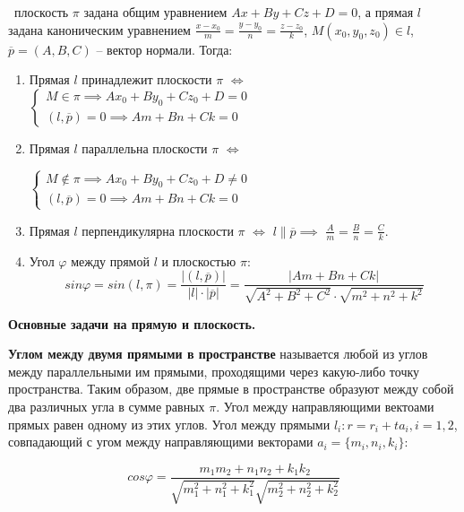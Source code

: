 \mathLet \ плоскость $\pi$ задана общим уравнением $Ax + By + Cz + D = 0$, а прямая $l$ задана каноническим уравнением $\frac{x-x_0}{m} = \frac{y-y_0}{n} = \frac{z-z_0}{k}$, $M(x_0, y_0, z_0) \in l$, $\overline{p} = (A, B, C)$ -- вектор нормали. Тогда:
\begin{enumerate}
    \item Прямая $l$ принадлежит плоскости $\pi$ $\iff$ \newline
    $
    \begin{cases}
        M \in \pi \implies Ax_0 +By_0 +Cz_0 +D = 0 \\
        (l, \overline{p}) = 0  \implies Am+Bn+Ck = 0
    \end{cases}
    $
    \item Прямая $l$ параллельна плоскости $\pi$ $\iff$ \newline
    
    $\begin{cases}
        M \notin \pi \implies Ax_0+By_0+Cz_0+D\neq 0 \\
        (l, \overline{p}) = 0  \implies Am+Bn+Ck = 0
    \end{cases}$
    
    \item Прямая $l$ перпендикулярна плоскости $\pi$ $\iff$ \newline
    $l \| \overline{p} \implies$ $\frac{A}{m} = \frac{B}{n} = \frac{C}{k}$.
    
    \item Угол $\varphi$ между прямой $l$ и плоскостью $\pi$: \newline
    $$  sin\varphi = sin(l, \pi) = \frac{| (l, \overline{p}) |}{|l| \cdot |\overline{p}|} = \frac{|Am+Bn+Ck|}{\sqrt{A^2+B^2+C^2}\cdot\sqrt{m^2+n^2+k^2}}$$
\end{enumerate}
   
\textbf{Основные задачи на прямую и плоскость.}

\textbf{Углом между двумя прямыми в пространстве} называется любой из углов между параллельными им прямыми, проходящими через какую-либо точку пространства. Таким образом, две прямые в пространстве образуют между собой два различных угла в сумме равных $\pi$. Угол между направляющими вектоами прямых равен одному из этих углов. Угол между прямыми $l_i: r = r_i + ta_i, i = 1,2$, совпадающий с угом между направляющими векторами $a_i = \{m_i, n_i, k_i\}$:

$$cos\varphi = \frac{m_1m_2 + n_1n_2 + k_1k_2}{\sqrt{m_1^2 + n_1^2 + k_1^2}\sqrt{m_2^2 + n_2^2 + k_2^2}}$$

